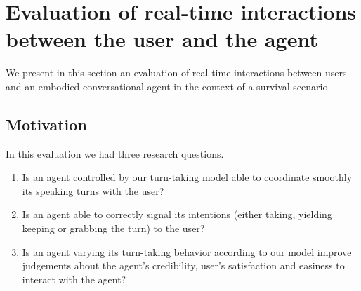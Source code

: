 \section{Evaluation of real-time interactions between the user and the agent}
\label{sec:eval}

We present in this section an evaluation of real-time interactions between users and an embodied conversational agent in the context of a survival scenario.

\subsection{Motivation}

In this evaluation we had three research questions.  \begin{enumerate}
	\item Is an agent controlled by our turn-taking model able to coordinate smoothly its speaking turns with the user?
	\item Is an agent able to correctly signal its intentions (either taking, yielding keeping or grabbing the turn) to the user?
	\item Is an agent varying its turn-taking behavior according to our model improve judgements about the agent's credibility, user's satisfaction and easiness to interact with the agent?
\end{enumerate}



